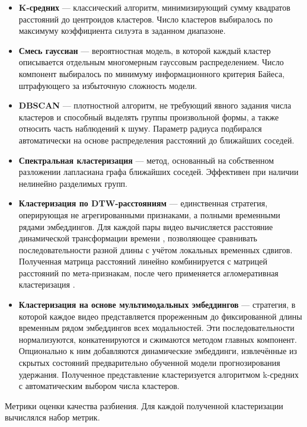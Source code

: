 \documentclass[times]{itmo-student-thesis}
\begin{document}
\begin{itemize}[label=\textbf{\textbullet},leftmargin=1.25cm]
    \item \textbf{K-средних} \cite{arthur2007kmeans} — классический алгоритм, минимизирующий сумму квадратов расстояний до центроидов кластеров. Число кластеров выбиралось по максимуму коэффициента силуэта в заданном диапазоне.
    \item \textbf{Смесь гауссиан} \cite{reynolds2009gmm} — вероятностная модель, в которой каждый кластер описывается отдельным многомерным гауссовым распределением. Число компонент выбиралось по минимуму информационного критерия Байеса, штрафующего за избыточную сложность модели.
    \item \textbf{DBSCAN} \cite{schubert2017dbscan} — плотностной алгоритм, не требующий явного задания числа кластеров и способный выделять группы произвольной формы, а также относить часть наблюдений к шуму. Параметр радиуса подбирался автоматически на основе распределения расстояний до ближайших соседей.
    \item \textbf{Спектральная кластеризация} \cite{ng2001spectral} — метод, основанный на собственном разложении лапласиана графа ближайших соседей. Эффективен при наличии нелинейно разделимых групп.
    \item \textbf{Кластеризация по DTW-расстояниям} — единственная стратегия, оперирующая не агрегированными признаками, а полными временными рядами эмбеддингов. Для каждой пары видео вычисляется расстояние динамической трансформации времени \cite{dtw1994}, позволяющее сравнивать последовательности разной длины с учётом локальных временных сдвигов. Полученная матрица расстояний линейно комбинируется с матрицей расстояний по мета-признакам, после чего применяется агломеративная кластеризация \cite{murtagh2012hierarchical}.
    \item \textbf{Кластеризация на основе мультимодальных эмбеддингов} — стратегия, в которой каждое видео представляется прореженным до фиксированной длины временным рядом эмбеддингов всех модальностей. Эти последовательности нормализуются, конкатенируются и сжимаются методом главных компонент. Опционально к ним добавляются динамические эмбеддинги, извлечённые из скрытых состояний предварительно обученной модели прогнозирования удержания. Полученное представление кластеризуется алгоритмом k-средних с автоматическим выбором числа кластеров.
\end{itemize}

Метрики оценки качества разбиения. Для каждой полученной кластеризации вычислялся набор метрик.
\end{document}
